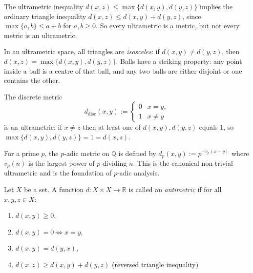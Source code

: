 \begin{remark*}
The ultrametric inequality $d(x,z) \le \max\{d(x,y), d(y,z)\}$
implies the ordinary triangle inequality
$d(x,z) \le d(x,y) + d(y,z)$,
since $\max\{a,b\} \le a + b$ for $a,b \ge 0$.
So every ultrametric is a metric, but not every metric is an ultrametric.
\end{remark*}

\begin{remark*}[Intuition]
In an ultrametric space, all triangles are \emph{isosceles}:
if $d(x,y) \neq d(y,z)$, then $d(x,z) = \max\{d(x,y), d(y,z)\}$.
Balls have a striking property: any point inside a ball is a centre of
that ball, and any two balls are either disjoint or one contains the other.
\end{remark*}





\begin{example*}
The discrete metric
\[
d_{\mathrm{disc}}(x,y) :=
\begin{cases} 0 & x = y, \\ 1 & x \neq y \end{cases}
\]
is an ultrametric: if $x \neq z$ then at least one of $d(x,y), d(y,z)$
equals $1$, so $\max\{d(x,y), d(y,z)\} = 1 = d(x,z)$.
\end{example*}

\begin{example*}
For a prime $p$, the $p$-adic metric on $\mathbb{Q}$ is defined by
$d_p(x,y) := p^{-v_p(x-y)}$ where $v_p(n)$ is the largest power of $p$
dividing $n$.
This is the canonical non-trivial ultrametric and is the foundation of
$p$-adic analysis.
\end{example*}

\begin{tcolorbox}[colback=propbox, colframe=propborder, arc=2pt,
  left=6pt, right=6pt, top=4pt, bottom=4pt,
  title={\small\textbf{Definition (Antimetric)}},
  fonttitle=\small\bfseries]
\begin{definition}[Antimetric]
\label{def:antimetric}
Let $X$ be a set. A function $d : X \times X \to \mathbb{R}$ is called
an \emph{antimetric} if for all $x,y,z \in X$:
\begin{enumerate}[label=(A\arabic*)]
  \item $d(x,y) \ge 0$,
  \item $d(x,y) = 0 \iff x = y$,
  \item $d(x,y) = d(y,x)$,
  \item $d(x,z) \ge d(x,y) + d(y,z)$ \hfill (reversed triangle inequality)
\end{enumerate}
\end{definition}
\end{tcolorbox}

